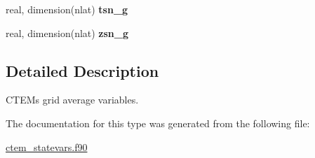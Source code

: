 \begin{DoxyCompactItemize}
\item 
\hypertarget{structctem__statevars_1_1ctem__gridavg_a32c22a4143426d2da8507af3737e90b0}{}real, dimension(nlat) {\bfseries tsn\+\_\+g}\label{structctem__statevars_1_1ctem__gridavg_a32c22a4143426d2da8507af3737e90b0}

\item 
\hypertarget{structctem__statevars_1_1ctem__gridavg_a9e57e6a1467adb542994e24fd270aa54}{}real, dimension(nlat) {\bfseries zsn\+\_\+g}\label{structctem__statevars_1_1ctem__gridavg_a9e57e6a1467adb542994e24fd270aa54}

\end{DoxyCompactItemize}


\subsection{Detailed Description}
C\+T\+E\+M\textquotesingle{}s grid average variables. 

The documentation for this type was generated from the following file\+:\begin{DoxyCompactItemize}
\item 
\hyperlink{ctem__statevars_8f90}{ctem\+\_\+statevars.\+f90}\end{DoxyCompactItemize}
